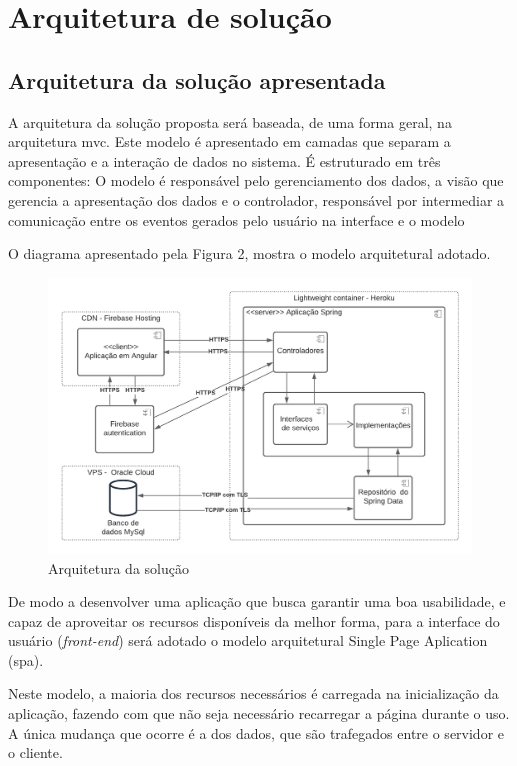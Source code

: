 \chapter{Arquitetura de solução}
\section{Arquitetura da solução apresentada}
A arquitetura da solução proposta será baseada, de uma forma geral, na arquitetura \ac{mvc}. Este modelo é apresentado em camadas que separam a apresentação e a interação de dados no sistema. É estruturado em três componentes: O modelo é responsável pelo gerenciamento dos dados, a visão que gerencia a apresentação dos dados e o controlador, responsável por intermediar a comunicação entre os eventos gerados pelo usuário na interface e o modelo \cite{engenharia-de-software:2018}

O diagrama apresentado pela Figura 2, mostra o modelo arquitetural adotado.

\begin{figure}[htb]
    \centering
	\includegraphics[width=16cm]{imagens/figura2.png}
	\caption{\label{fig_logo} Arquitetura da solução}
\end{figure}
 
 
De modo a desenvolver uma aplicação que busca garantir uma boa usabilidade, e capaz de aproveitar os recursos disponíveis da melhor forma, para a interface do usuário (\textit{\gls{front-end}}) será adotado o modelo arquitetural Single Page Aplication (\ac{spa}). 


Neste modelo, a maioria dos recursos necessários é carregada na inicialização da aplicação, fazendo com que não seja necessário recarregar a página durante o uso. A única mudança que ocorre é a dos dados, que são trafegados entre o servidor e o cliente.


